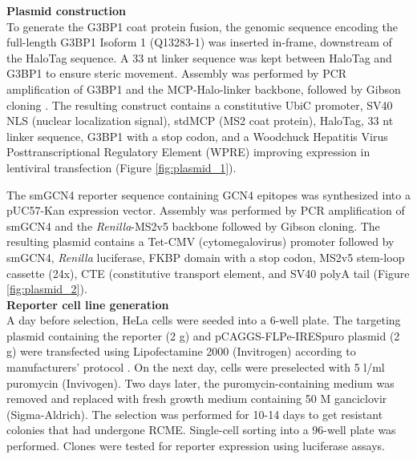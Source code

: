 \textbf{Plasmid construction} \\
To generate the G3BP1 coat protein fusion, the genomic sequence encoding the full-length G3BP1 Isoform 1 (Q13283-1) was inserted in-frame, downstream of the HaloTag sequence.
A 33 nt linker sequence was kept between HaloTag and G3BP1 to ensure steric movement.
Assembly was performed by PCR amplification of G3BP1 and the MCP-Halo-linker backbone, followed by Gibson cloning \cite{gibson_enzymatic_2009}.
The resulting construct contains a constitutive UbiC promoter, SV40 NLS (nuclear localization signal), stdMCP (MS2 coat protein), HaloTag, 33 nt linker sequence, G3BP1 with a stop codon, and a  Woodchuck Hepatitis Virus Posttranscriptional Regulatory Element (WPRE) improving expression in lentiviral transfection (Figure \ref{fig:plasmid_1}).

The smGCN4 reporter sequence containing GCN4 epitopes was synthesized into a pUC57-Kan expression vector.
Assembly was performed by PCR amplification of smGCN4 and the \textit{Renilla}-MS2v5 backbone followed by Gibson cloning.
The resulting plasmid contains a Tet-CMV (cytomegalovirus) promoter followed by smGCN4, \textit{Renilla} luciferase, FKBP domain with a stop codon, MS2v5 stem-loop cassette (24x), CTE (constitutive transport element, and SV40 polyA tail (Figure \ref{fig:plasmid_2}).
\\

\textbf{Reporter cell line generation} \\
A day before selection, HeLa cells were seeded into a 6-well plate.
The targeting plasmid containing the reporter (2 \textmu g) and pCAGGS-FLPe-IRESpuro plasmid (2 \textmu g) were transfected using Lipofectamine 2000 (Invitrogen) according to manufacturers’ protocol \cite{beard_efficient_2006}.
On the next day, cells were preselected with 5 \textmu l/ml puromycin (Invivogen). Two days later, the puromycin-containing medium was removed and replaced with fresh growth medium containing 50 \textmu M ganciclovir (Sigma-Aldrich).
The selection was performed for 10-14 days to get resistant colonies that had undergone RCME.
Single-cell sorting into a 96-well plate was performed.
Clones were tested for reporter expression using luciferase assays.
\\

